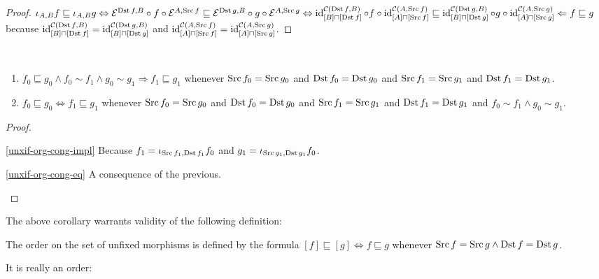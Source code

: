 \begin{proof}
$\iota_{A,B}f\sqsubseteq\iota_{A,B}g \Leftrightarrow
\mathcal{E}^{\operatorname{Dst} f,B}\circ f\circ\mathcal{E}^{A,\operatorname{Src} f}
\sqsubseteq
\mathcal{E}^{\operatorname{Dst} g,B}\circ g\circ\mathcal{E}^{A,\operatorname{Src} g}
\Leftrightarrow
\operatorname{id}^{\mathcal{C}(\operatorname{Dst} f,B)}_{[B]\sqcap[\operatorname{Dst} f]}\circ f\circ\operatorname{id}^{\mathcal{C}(A,\operatorname{Src} f)}_{[A]\sqcap[\operatorname{Src} f]}
\sqsubseteq
\operatorname{id}^{\mathcal{C}(\operatorname{Dst} g,B)}_{[B]\sqcap[\operatorname{Dst} g]}\circ g\circ\operatorname{id}^{\mathcal{C}(A,\operatorname{Src} g)}_{[A]\sqcap[\operatorname{Src} g]}
\Leftarrow f\sqsubseteq g$ because
$\operatorname{id}^{\mathcal{C}(\operatorname{Dst} f,B)}_{[B]\sqcap[\operatorname{Dst} f]}=
\operatorname{id}^{\mathcal{C}(\operatorname{Dst} g,B)}_{[B]\sqcap[\operatorname{Dst} g]}$ and
$\operatorname{id}^{\mathcal{C}(A,\operatorname{Src} f)}_{[A]\sqcap[\operatorname{Src} f]}=
\operatorname{id}^{\mathcal{C}(A,\operatorname{Src} g)}_{[A]\sqcap[\operatorname{Src} g]}$.
\end{proof}

\begin{cor}\label{unxif-org-cong}
~
\begin{enumerate}
\item\label{unxif-org-cong-impl}
$f_0\sqsubseteq g_0\land f_0\sim f_1\land g_0\sim g_1
\Rightarrow f_1\sqsubseteq g_1$ whenever
$\operatorname{Src} f_0=\operatorname{Src} g_0$ and $\operatorname{Dst} f_0=\operatorname{Dst} g_0$ and
$\operatorname{Src} f_1=\operatorname{Src} g_1$ and $\operatorname{Dst} f_1=\operatorname{Dst} g_1$.
\item\label{unxif-org-cong-eq}
$f_0\sqsubseteq g_0\Leftrightarrow f_1\sqsubseteq g_1$ whenever
$\operatorname{Src} f_0=\operatorname{Src} g_0$ and $\operatorname{Dst} f_0=\operatorname{Dst} g_0$ and
$\operatorname{Src} f_1=\operatorname{Src} g_1$ and $\operatorname{Dst} f_1=\operatorname{Dst} g_1$ and
$f_0\sim f_1\land g_0\sim g_1$.
\end{enumerate}
\end{cor}

\begin{proof}
~
\begin{disorder}
\item[\ref{unxif-org-cong-impl}] Because
$f_1=\iota_{\operatorname{Src} f_1,\operatorname{Dst} f_1}f_0$ and
$g_1=\iota_{\operatorname{Src} g_1,\operatorname{Dst} g_1}f_0$.
\item[\ref{unxif-org-cong-eq}] A consequence of the
previous.
\end{disorder}
\end{proof}

The above corollary warrants validity of the following
definition:

\begin{defn}
The order on the set of unfixed morphisms is defined
by the formula
$[f]\sqsubseteq[g]\Leftrightarrow f\sqsubseteq g$
whenever $\operatorname{Src} f=\operatorname{Src} g\land\operatorname{Dst} f=\operatorname{Dst} g$.
\end{defn}

It is really an order:

